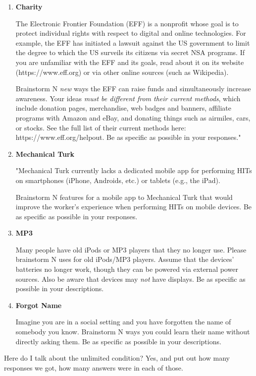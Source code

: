 \begin{enumerate}
\item \textbf{Charity}

The Electronic Frontier Foundation (EFF) is a nonprofit whose goal is to protect individual rights with respect to digital and online technologies. For example, the EFF has initiated a lawsuit against the US government to limit the degree to which the US surveils its citizens via secret NSA programs. If you are unfamiliar with the EFF and its goals, read about it on its website (https://www.eff.org) or via other online sources (such as Wikipedia).

Brainstorm N \emph{new} ways the EFF can raise funds and simultaneously increase awareness. Your ideas \emph{must be different from their current methods}, which include donation pages, merchandise, web badges and banners, affiliate programs with Amazon and eBay, and donating things such as airmiles, cars, or stocks. See the full list of their current methods here: https://www.eff.org/helpout. Be as specific as possible in your responses."

\item \textbf{Mechanical Turk}

"Mechanical Turk currently lacks a dedicated mobile app for performing HITs on smartphones (iPhone, Androids, etc.) or tablets (e.g., the iPad).

Brainstorm N features for a mobile app to Mechanical Turk that would improve the worker's experience when performing HITs on mobile devices. Be as specific as possible in your responses.

\item \textbf{MP3}

Many people have old iPods or MP3 players that they no longer use. Please brainstorm N uses for old iPods/MP3 players. Assume that the devices' batteries no longer work, though they can be powered via external power sources. Also be aware that devices may \emph{not} have displays. Be as specific as possible in your descriptions.

\item \textbf{Forgot Name}

Imagine you are in a social setting and you have forgotten the name of somebody you know. Brainstorm N ways you could learn their name without directly asking them. Be as specific as possible in your descriptions.

\end{enumerate}

Here do I talk about the unlimited condition? Yes, and put out how many responses we got, how many answers were in each of those.


